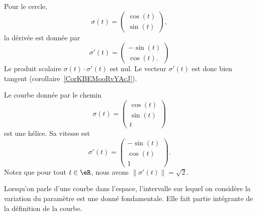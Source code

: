 \begin{example}
    Pour le cercle,
    \begin{equation}
        \sigma(t)=\begin{pmatrix}
            \cos(t)    \\
            \sin(t)
        \end{pmatrix},
    \end{equation}
    la dérivée est donnée par
    \begin{equation}
        \sigma'(t)=\begin{pmatrix}
            -\sin(t)    \\
            \cos(t).
        \end{pmatrix}
    \end{equation}
    Le produit scalaire $\sigma(t)\cdot \sigma'(t)$ est nul. Le vecteur $\sigma'(t)$ est donc bien tangent (corollaire~\ref{CorKBEMooRvYAcJ}).
\end{example}

\begin{example}
    Le courbe donnée par le chemin
    \begin{equation}
        \sigma(t)=\begin{pmatrix}
            \cos(t)    \\
            \sin(t)    \\
            t
        \end{pmatrix}
    \end{equation}
    est une hélice. Sa vitesse est
    \begin{equation}
        \sigma'(t)=\begin{pmatrix}
            -\sin(t)    \\
            \cos(t)    \\
            1
        \end{pmatrix}.
    \end{equation}
    Notez que pour tout $t\in\eR$, nous avons $\| \sigma'(t) \|=\sqrt{2}$.
\end{example}

\begin{remark}
    Lorsqu'on parle d'une courbe dans l'espace, l'intervalle sur lequel on considère la variation du paramètre est une donné fondamentale. Elle fait partie intégrante de la définition de la courbe.
\end{remark}


